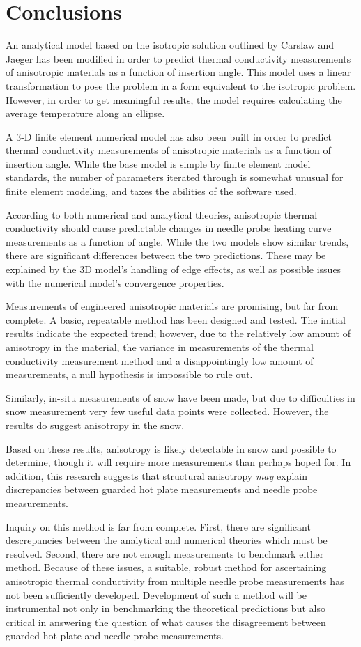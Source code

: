 \chapter{Conclusions}

An analytical model based on the isotropic solution outlined by
Carslaw and Jaeger has been modified in order to predict thermal conductivity
measurements of anisotropic materials as a function of insertion angle.  This
model uses a linear transformation to pose the problem in a form equivalent to
the isotropic problem. However, in order to get meaningful results, the model
requires calculating the average temperature along an ellipse.

A 3-D finite element numerical model has also been built in order to predict
thermal conductivity measurements  of anisotropic materials as a function of
insertion angle. While the base model is simple by finite element model
standards, the number of parameters iterated through is somewhat unusual for
finite element modeling, and taxes the abilities of the software used.

According to both numerical and analytical theories, anisotropic thermal
conductivity should cause predictable changes in needle probe heating curve
measurements as a function of angle. While the two models show similar trends, 
there are significant differences between the two predictions. These
may be explained by the 3D model's handling of edge effects, as well as possible
issues with the numerical model's convergence properties.

Measurements of engineered anisotropic materials are promising, but far from
complete. A basic, repeatable method has been designed and tested. The initial
results indicate the expected trend; however, due to the relatively low
amount of anisotropy in the material, the variance in measurements of the thermal
conductivity measurement method and a disappointingly low amount of
measurements, a null hypothesis is impossible to rule out.

Similarly, in-situ measurements of snow have been made, but due to difficulties
in snow measurement very few useful data points were collected. However, the
results do suggest anisotropy in the snow.

Based on these results, anisotropy is likely detectable in snow and possible to
determine, though it will require more measurements than perhaps hoped for. In
addition, this research suggests that structural anisotropy \emph{may} explain
discrepancies between guarded hot plate measurements and needle probe
measurements.

Inquiry on this method is far from complete. First, there are significant
descrepancies between the analytical and numerical theories which must be resolved.
Second, there are not enough measurements to benchmark either method. Because
of these issues, a suitable, robust method for ascertaining anisotropic thermal
conductivity from multiple needle probe measurements has not been sufficiently
developed. Development of such a method will be instrumental not only in
benchmarking the theoretical predictions but also critical in answering the
question of what causes the disagreement between guarded hot plate and
needle probe measurements.
